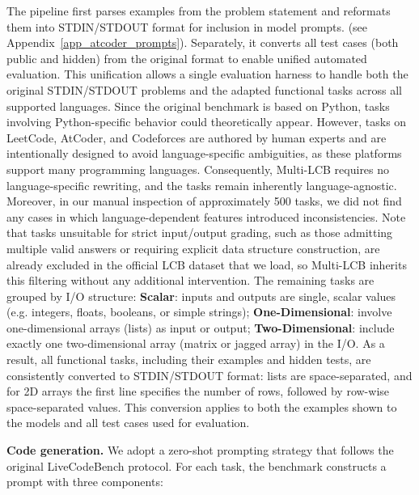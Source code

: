 \documentclass{llmxive}
\begin{document}
The pipeline first parses examples from the problem statement and reformats them into STDIN/STDOUT format for inclusion in model prompts. (see Appendix~\ref{app_atcoder_prompts}). Separately, it converts all test cases (both public and hidden) from the original format to enable unified automated evaluation. This unification allows a single evaluation harness to handle both the original STDIN/STDOUT problems and the adapted functional tasks across all supported languages. 
Since the original benchmark is based on Python, tasks involving Python-specific behavior could theoretically appear. However, tasks on LeetCode, AtCoder, and Codeforces are authored by human experts and are intentionally designed to avoid language-specific ambiguities, as these platforms support many programming languages. Consequently, Multi-LCB requires no language-specific rewriting, and the tasks remain inherently language-agnostic. Moreover, in our manual inspection of approximately 500 tasks, we did not find any cases in which language-dependent features introduced inconsistencies.
Note that tasks unsuitable for strict input/output grading, such as those admitting multiple valid answers or requiring explicit data structure construction, are already excluded in the official LCB dataset that we load, so Multi-LCB inherits this filtering without any additional intervention. The remaining tasks are grouped by I/O structure:
\textbf{Scalar}: inputs and outputs are single, scalar values (e.g. integers, floats, booleans, or simple strings); \textbf{One-Dimensional}: involve one-dimensional arrays (lists) as input or output; \textbf{Two-Dimensional}: include exactly one two-dimensional array (matrix or jagged array) in the I/O. As a result, all functional tasks, including their examples and hidden tests, are consistently converted to STDIN/STDOUT format: lists are space-separated, and for 2D arrays the first line specifies the number of rows, followed by row-wise space-separated values. This conversion applies to both the examples shown to the models and all test cases used for evaluation.


\textbf{Code generation.} We adopt a zero-shot prompting strategy that follows the original LiveCodeBench protocol.
For each task, the benchmark constructs a prompt with three components:
\end{document}
